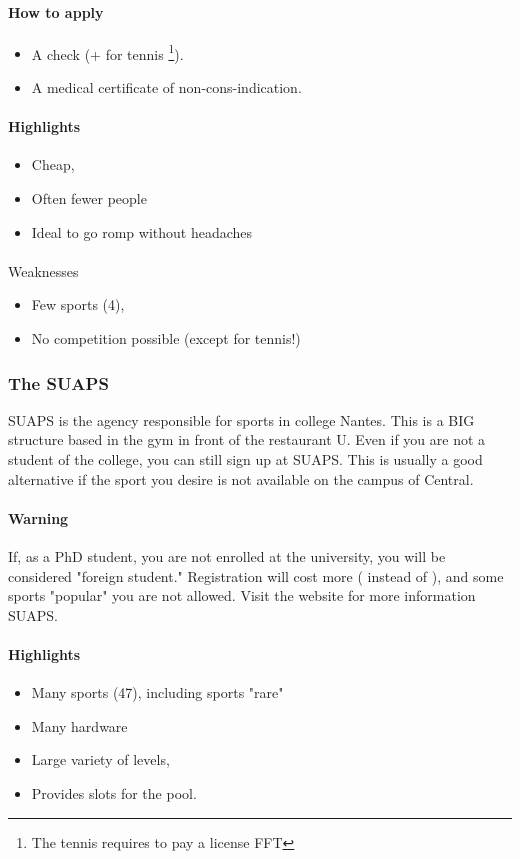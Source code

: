\paragraph{How to apply}
\begin{itemize}
  \item A check  (+  for tennis \footnote {The tennis requires to pay a license FFT}).
  \item A medical certificate of non-cons-indication.
\end{itemize}

\paragraph{Highlights}
\begin{itemize}
  \item Cheap,
  \item Often fewer people
  \item Ideal to go romp without headaches
\end{itemize}
\paragraph{} Weaknesses
\begin{itemize}
  \item Few sports (4),
  \item No competition possible (except for tennis!)
\end{itemize}

\subsubsection {The SUAPS}
SUAPS is the agency responsible for sports in college Nantes.
This is a BIG structure based in the gym in front of the restaurant U.
Even if you are not a student of the college, you can still sign up at SUAPS.
This is usually a good alternative if the sport you desire is not available on the campus of Central.

\paragraph{Warning} If, as a PhD student, you are not enrolled at the university, you will be considered "foreign student."
Registration will cost more ( instead of ), and some sports "popular" you are not allowed.
Visit the website for more information SUAPS.

\paragraph{Highlights}
\begin{itemize}
  \item Many sports (47), including sports "rare"
  \item Many hardware
  \item Large variety of levels,
  \item Provides slots for the pool.
\end{itemize}

